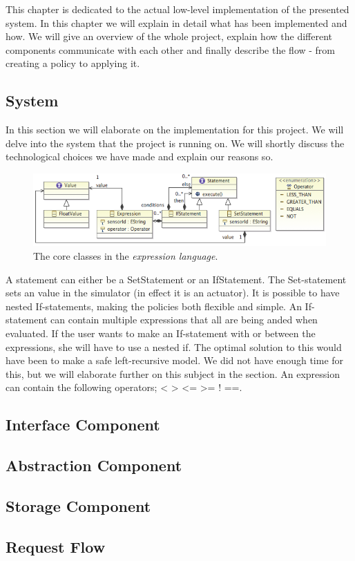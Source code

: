 This chapter is dedicated to the actual low-level implementation of the presented system. In this chapter we will explain in detail what has been implemented and how. We will give an overview of the whole project, explain how the different components communicate with each other and finally describe the flow - from creating a policy to applying it. 

\subsection{System}
In this section we will elaborate on the implementation for this project. We will delve into the system that the project is running on. We will shortly discuss the technological choices we have made and explain our reasons so.

\begin{figure}
	\centering
    \includegraphics[scale=0.55]{chapters/implementation-model-expression-language.png} 
	\caption{The core classes in the \textit{expression language}.}
	\label{fig:ecore-sensors-actuators}
\end{figure}

A statement can either be a SetStatement or an IfStatement. The Set-statement sets an value in the simulator (in effect it is an actuator). It is possible to have nested If-statements, making the policies both flexible and simple. An If-statement can contain multiple expressions that all are being anded when evaluated. If the user wants to make an If-statement with or between the expressions, she will have to use a nested if. The optimal solution to this would have been to make a safe left-recursive model. We did not have enough time for this, but we will elaborate further on this subject in the  section. An expression can contain the following operators; < > <= >= ! ==. 


\subsection{Interface Component}

\subsection{Abstraction Component}

\subsection{Storage Component}

\subsection{Request Flow}